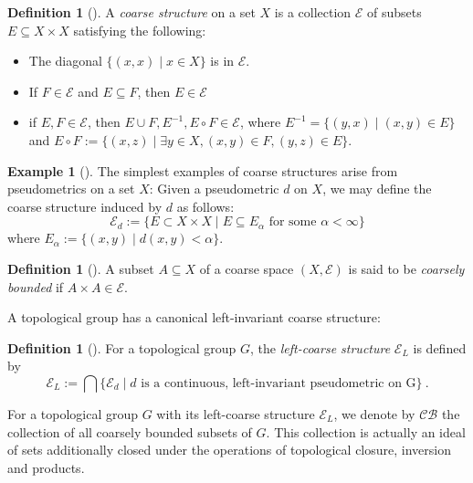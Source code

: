 \documentclass[twoside]{amsart}
\theoremstyle{plain}
\theoremstyle{break}
\theoremstyle{definition}
\newtheorem{definition}[theorem]{Definition}
\newtheorem{example}[theorem]{Example}
\theoremstyle{remark}
\begin{document}

\begin{definition}[{\cite[Defn.~2.2]{rosendal}}]\label{def:coarse_str}
    A \textit{coarse structure} on a set $X$ is a collection $\mathcal{E}$ of
    subsets $E\subseteq X\times X$ satisfying the following:

    \begin{itemize}
        \item The diagonal $\{(x,x)\mid x\in X\}$ is in $\mathcal{E}$.

        \item If $F\in\mathcal{E}$ and $E\subseteq F$, then $E\in\mathcal{E}$

        \item if $E,F\in\mathcal{E}$, then $E\cup F,E^{-1},E\circ
      F\in\mathcal{E}$, where $E^{-1}=\{(y,x)\mid(x,y)\in E\}$ and
      $E\circ F:=\{(x,z)\mid\exists y\in X, (x,y)
      \in F,(y,z)\in E\}$.
  \end{itemize}
\end{definition}

\begin{example}[{\cite[Example ~2.3]{rosendal}}]\label{ex:cs_pseudometric}
    The simplest examples of coarse structures arise from
    pseudometrics on a set $X$: Given a pseudometric $d$ on $X$, we
    may define the coarse structure induced by $d$ as follows:
   \[ 
    \mathcal{E}_d:=\{E\subset X\times X\mid E\subseteq E_\alpha\text{ for some }\alpha<\infty\}
  \] 
    where $E_\alpha:=\{(x,y)\mid d(x,y)<\alpha\}$.
\end{example}

\begin{definition}
[{\cite[Defn.~2.12]{rosendal}}]\label{def:cb_set} A subset
$A\subseteq X$ of a coarse space $(X,\mathcal{E})$ is said to be
\textit{coarsely bounded} if $A\times A\in\mathcal{E}$. 
\end{definition}

A topological group has a canonical left-invariant coarse structure:

\begin{definition}[{\cite[Defn.~2.10]{rosendal}}]\label{def:left_coarse_str}
    For a topological group $G$, the \textit{left-coarse structure}
    $\mathcal{E}_L$ is defined by 
    \[ 
    \mathcal{E}_L:=\bigcap\{\mathcal{E}_d\mid d\text{ is a
    continuous, left-invariant pseudometric on G}\}\:.
  \] 
\end{definition}
\noindent
For a topological group $G$ with its left-coarse structure
$\mathcal{E}_L$, we denote by $\mathcal{CB}$ the collection of all
coarsely bounded subsets of $G$.
This collection
is actually an ideal of sets additionally 
closed under the operations of topological closure, inversion and products.
\end{document}
